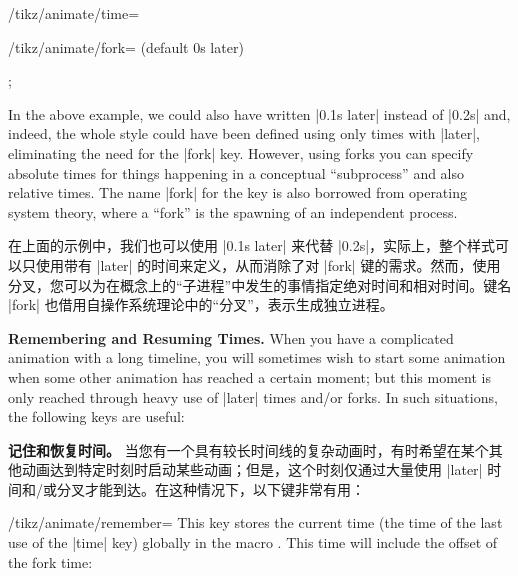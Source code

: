 \begin{key}{/tikz/animate/time=}
\begin{key}{/tikz/animate/fork= (default 0s later)}
\begin{codeexample}[
    preamble={\usetikzlibrary{animations}},
    animation list={1.05,1.1,1.15,1.2,2.05,2.1,2.15,2.2},
]
\tikz [animate/highlight/.style = {
    scope = { fork = #1,
              :fill = { 0s = "black", 0.1s = "white", 0.2s = "black"} }
  }]
  ;
\end{codeexample}
        In the above example, we could also have written |0.1s later| instead
        of |0.2s| and, indeed, the whole style could have been defined using
        only times with |later|, eliminating the need for the |fork| key.
        However, using forks you can specify absolute times for things
        happening in a conceptual ``subprocess'' and also relative times. The
        name |fork| for the key is also borrowed from operating system theory,
        where a ``fork'' is the spawning of an independent process.

        在上面的示例中，我们也可以使用 |0.1s later| 来代替 |0.2s|，实际上，整个样式可以只使用带有 |later| 的时间来定义，从而消除了对 |fork| 键的需求。然而，使用分叉，您可以为在概念上的“子进程”中发生的事情指定绝对时间和相对时间。键名 |fork| 也借用自操作系统理论中的“分叉”，表示生成独立进程。


    \end{key}

    \medskip\textbf{Remembering and Resuming Times.}
    When you have a complicated animation with a long timeline, you will
    sometimes wish to start some animation when some other animation has
    reached a certain moment; but this moment is only reached through heavy use
    of |later| times and/or forks. In such situations, the following keys are
    useful:

    \medskip\textbf{记住和恢复时间。}
当您有一个具有较长时间线的复杂动画时，有时希望在某个其他动画达到特定时刻时启动某些动画；但是，这个时刻仅通过大量使用 |later| 时间和/或分叉才能到达。在这种情况下，以下键非常有用：


    \begin{key}{/tikz/animate/remember=}
        This key stores the current time (the time of the last use of the
        |time| key) globally in the macro . This time will
        include the offset of the fork time:
        

\end{key}
\end{key}
